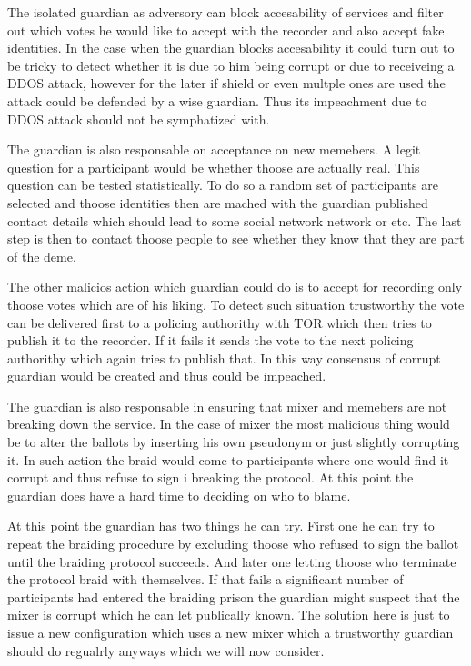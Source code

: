 \documentclass{article}
\begin{document}
The isolated guardian as adversory can block accesability of services and filter out which votes he would like to accept with the recorder and also accept fake identities. In the case when the guardian blocks accesability it could turn out to be tricky to detect whether it is due to him being corrupt or due to receiveing a DDOS attack, however for the later if shield or even multple ones are used the attack could be defended by a wise guardian. Thus its impeachment due to DDOS attack should not be symphatized with.

The guardian is also responsable on acceptance on new memebers. A legit question for a participant would be whether thoose are actually real. This question can be tested statistically. To do so a random set of participants are selected and thoose identities then are mached with the guardian published contact details which should lead to some social network network or etc. The last step is then to contact thoose people to see whether they know that they are part of the deme.

The other malicios action which guardian could do is to accept for recording only thoose votes which are of his liking. To detect such situation trustworthy the vote can be delivered first to a policing authorithy with TOR which then tries to publish it to the recorder. If it fails it sends the vote to the next policing authorithy which again tries to publish that. In this way consensus of corrupt guardian would be created and thus could be impeached.

The guardian is also responsable in ensuring that mixer and memebers are not breaking down the service. In the case of mixer the most malicious thing would be to alter the ballots by inserting his own pseudonym or just slightly corrupting it. In such action the braid would come to participants where one would find it corrupt and thus refuse to sign i breaking the protocol. At this point the guardian does have a hard time to deciding on who to blame.

At this point the guardian has two things he can try. First one he can try to repeat the braiding procedure by excluding thoose who refused to sign the ballot until the braiding protocol succeeds. And later one letting thoose who terminate the protocol braid with themselves. If that fails a significant number of participants had entered the braiding prison the guardian might suspect that the mixer is corrupt which he can let publically known. The solution here is just to issue a new configuration which uses a new mixer which a trustworthy guardian should do regualrly anyways which we will now consider.
\end{document}
